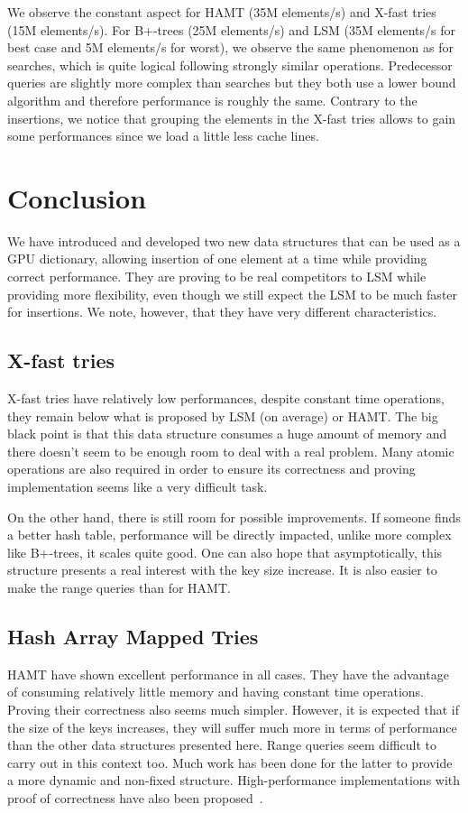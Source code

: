 \documentclass[conference]{IEEEtran}
\begin{document}
We observe the constant aspect for HAMT (35M elements/s) and X-fast tries (15M elements/s). For B+-trees (25M elements/s) and LSM (35M elements/s for best case and 5M elements/s for worst), we observe the same phenomenon as for searches, which is quite logical following strongly similar operations. Predecessor queries are slightly more complex than searches but they both use a lower bound algorithm and therefore performance is roughly the same. Contrary to the insertions, we notice that grouping the elements in the X-fast tries allows to gain some performances since we load a little less cache lines.

\section{Conclusion}

We have introduced and developed two new data structures that can be used as a GPU dictionary, allowing insertion of one element at a time while providing correct performance. They are proving to be real competitors to LSM while providing more flexibility, even though we still expect the LSM to be much faster for insertions. We note, however, that they have very different characteristics.

\subsection{X-fast tries}

X-fast tries have relatively low performances, despite constant time operations, they remain below what is proposed by LSM (on average) or HAMT. The big black point is that this data structure consumes a huge amount of memory and there doesn't seem to be enough room to deal with a real problem. Many atomic operations are also required in order to ensure its correctness and proving implementation seems like a very difficult task.

On the other hand, there is still room for possible improvements. If someone finds a better hash table, performance will be directly impacted, unlike more complex like B+-trees, it scales quite good. One can also hope that asymptotically, this structure presents a real interest with the key size increase. It is also easier to make the range queries than for HAMT.

\subsection{Hash Array Mapped Tries}

HAMT have shown excellent performance in all cases. They have the advantage of consuming relatively little memory and having constant time operations. Proving their correctness also seems much simpler. However, it is expected that if the size of the keys increases, they will suffer much more in terms of performance than the other data structures presented here. Range queries seem difficult to carry out in this context too. Much work has been done for the latter to provide a more dynamic and non-fixed structure. High-performance implementations with proof of correctness have also been proposed~\cite{prokopec2017cache}.



\end{document}
